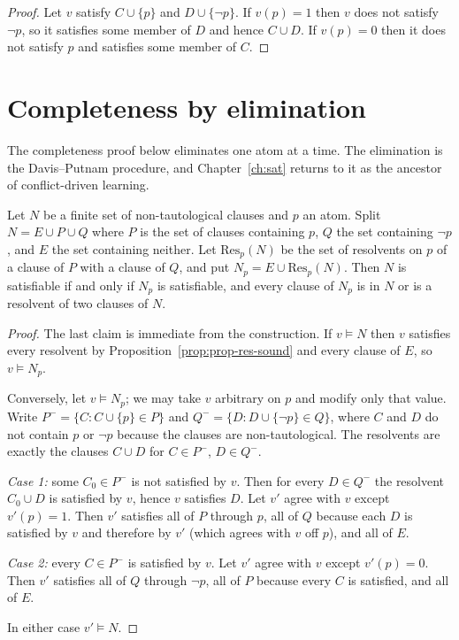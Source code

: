 \begin{proof}
Let $v$ satisfy $C\cup\{p\}$ and $D\cup\{\neg p\}$. If $v(p)=1$ then $v$ does not satisfy $\neg p$, so it satisfies some member of $D$ and hence $C\cup D$. If $v(p)=0$ then it does not satisfy $p$ and satisfies some member of $C$.
\end{proof}

\section{Completeness by elimination}
\label{sec:dp}

The completeness proof below eliminates one atom at a time. The elimination is the Davis--Putnam procedure, and Chapter~\ref{ch:sat} returns to it as the ancestor of conflict-driven learning.

\begin{lemma}
\label{lem:elim}
Let $N$ be a finite set of non-tautological clauses and $p$ an atom. Split $N=E\cup P\cup Q$ where $P$ is the set of clauses containing $p$, $Q$ the set containing $\neg p$, and $E$ the set containing neither. Let $\mathrm{Res}_p(N)$ be the set of resolvents on $p$ of a clause of $P$ with a clause of $Q$, and put $N_p=E\cup\mathrm{Res}_p(N)$. Then $N$ is satisfiable if and only if $N_p$ is satisfiable, and every clause of $N_p$ is in $N$ or is a resolvent of two clauses of $N$.
\end{lemma}

\begin{proof}
The last claim is immediate from the construction. If $v\models N$ then $v$ satisfies every resolvent by Proposition~\ref{prop:prop-res-sound} and every clause of $E$, so $v\models N_p$.

Conversely, let $v\models N_p$; we may take $v$ arbitrary on $p$ and modify only that value. Write $P^-=\{C: C\cup\{p\}\in P\}$ and $Q^-=\{D:D\cup\{\neg p\}\in Q\}$, where $C$ and $D$ do not contain $p$ or $\neg p$ because the clauses are non-tautological. The resolvents are exactly the clauses $C\cup D$ for $C\in P^-$, $D\in Q^-$.

\emph{Case 1:} some $C_0\in P^-$ is not satisfied by $v$. Then for every $D\in Q^-$ the resolvent $C_0\cup D$ is satisfied by $v$, hence $v$ satisfies $D$. Let $v'$ agree with $v$ except $v'(p)=1$. Then $v'$ satisfies all of $P$ through $p$, all of $Q$ because each $D$ is satisfied by $v$ and therefore by $v'$ (which agrees with $v$ off $p$), and all of $E$.

\emph{Case 2:} every $C\in P^-$ is satisfied by $v$. Let $v'$ agree with $v$ except $v'(p)=0$. Then $v'$ satisfies all of $Q$ through $\neg p$, all of $P$ because every $C$ is satisfied, and all of $E$.

In either case $v'\models N$.
\end{proof}

